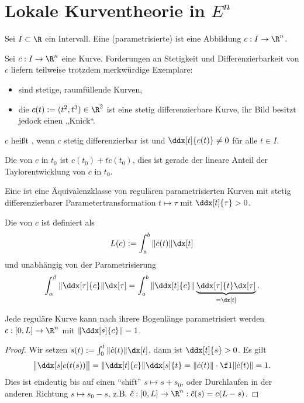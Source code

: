 \chapter{Lokale Kurventheorie in $E^n$}

\begin{df}
	Sei $I \subset \R$ ein Intervall.
	Eine (parametrisierte)  ist eine Abbildung $c: I \to \R^n$.
\end{df}

\begin{ex}
	Sei $c: I \to \R^n$ eine Kurve.
	Forderungen an Stetigkeit und Differenzierbarkeit von $c$ liefern teilweise trotzdem merkwürdige Exemplare:
	\begin{itemize}
		\item
			 sind stetige, raumfüllende Kurven,
		\item
			die  $c(t) := (t^2, t^3) \in \R^2$ ist eine stetig differenzierbare Kurve, ihr Bild besitzt jedock einen „Knick“.
	\end{itemize}
\end{ex}

\begin{df}
	$c$ heißt , wenn $c$ stetig differenzierbar ist und $\ddx[t]{c(t)} \neq 0$ für alle $t \in I$.

	Die  von $c$ in $t_0$ ist $c(t_0) + t \dot c(t_0)$, dies ist gerade der lineare Anteil der Taylorentwicklung von $c$ in $t_0$.

	Eine  ist eine Äquivalenzklasse von regulären parametrisierten Kurven mit stetig differenzierbarer Parametertransformation $t \mapsto \tau$ mit $\ddx[t]{\tau} > 0$.

	Die  von $c$ ist definiert als
	\[
		L(c) := \int_a^b \|\dot c(t)\| \dx[t]
	\]
	und unabhängig von der Parametrisierung
	\[
		\int_{\alpha}^{\beta} \| \ddx[\tau]{c} \| \dx[\tau]
		= \int_a^b \|\ddx[t]{c} \| \underbrace{\ddx[\tau]{t} \dx[\tau]}_{= \dx[t]}.
	\]
\end{df}

\begin{lem}
	Jede reguläre Kurve kann nach ihrere Bogenlänge parametrisiert werden $c: [0,L] \to \R^n$ mit $\|\ddx[s]{c}\| = 1$.
	\begin{proof}
		Wir setzen $s(t) := \int_0^t \|\dot c(t)\| \dx[t]$, dann ist $\ddx[t]{s} > 0$.
		Es gilt
		\[
			\big\| \ddx[s] c(t(s)) \big\|
			= \| \ddx[t]{c} \| \ddx[s]{t}
			= \|\dot c(t)\| \cdot \f 1{\|\dot c(t)\|}
			= 1.
		\]
		Dies ist eindeutig bis auf einen “shift” $s \mapsto s + s_0$,
		oder Durchlaufen in der anderen Richtung $s \mapsto s_0 - s$, z.B. $\tilde c: [0,L] \to \R^n : \tilde c(s) = c(L - s)$.
	\end{proof}
\end{lem}

